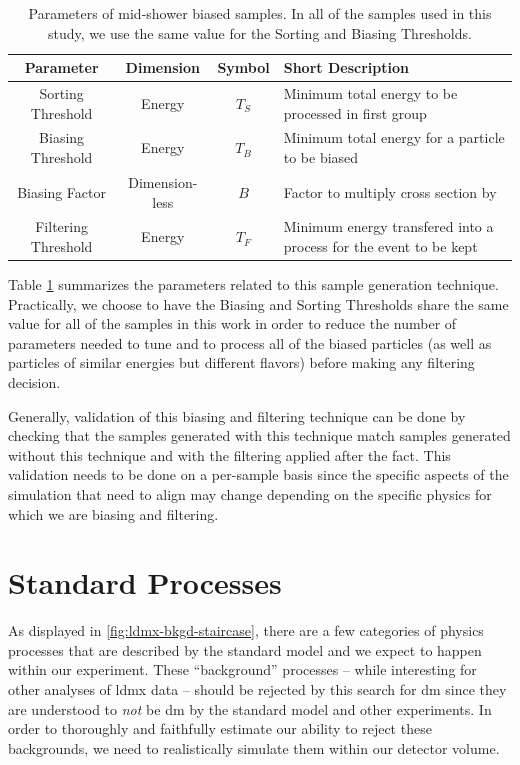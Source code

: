 \begin{table}[htb]
    \centering
    \begin{tabular}{c|cc|p{}}
        Parameter & Dimension & Symbol & Short Description \\ \hline \hline
        Sorting Threshold & Energy & $T_S$ & Minimum total energy to be processed in first group \\ \hline
        Biasing Threshold & Energy & $T_B$ & Minimum total energy for a particle to be biased \\ \hline
        Biasing Factor & Dimension-less & $B$ & Factor to multiply cross section by \\ \hline
        Filtering Threshold & Energy & $T_F$ & Minimum energy transfered into a process for the event to be kept \\
    \end{tabular}
    \caption{Parameters of mid-shower biased samples. In all of the samples used in this study, we use the same value for the Sorting and Biasing Thresholds.}
    \label{tab:biasing-parameters}
\end{table}

Table \ref{tab:biasing-parameters} summarizes the parameters related to this
sample generation technique.
Practically, we choose to have the Biasing and Sorting Thresholds share the same value for all
of the samples in this work in order to reduce the number of parameters needed to tune and
to process all of the biased particles (as well as particles of similar energies
but different flavors) before making any filtering decision.

Generally, validation of this biasing and filtering technique can be done by checking that
the samples generated with this technique match samples generated without this technique
and with the filtering applied after the fact.
This validation needs to be done on a per-sample basis since the specific aspects of
the simulation that need to align may change depending on the specific physics
for which we are biasing and filtering.

\section{Standard Processes}
As displayed in \cref{fig:ldmx-bkgd-staircase}, there are a few categories of physics processes
that are described by the standard model and we expect to happen within our experiment. These
``background'' processes -- while interesting for other analyses of \ac{ldmx} data -- should be
rejected by this search for \ac{dm} since they are understood to \emph{not} be \ac{dm} by the
standard model and other experiments. In order to thoroughly and faithfully estimate our ability to
reject these backgrounds, we need to realistically simulate them within our detector volume.

